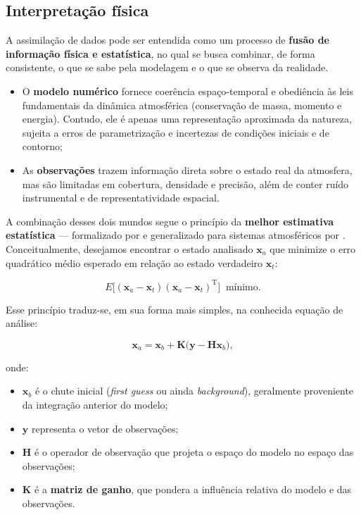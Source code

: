 \subsection*{Interpretação física}

A assimilação de dados pode ser entendida como um processo de \textbf{fusão de informação física e estatística}, no qual se busca combinar, de forma consistente, o que se sabe pela modelagem e o que se observa da realidade.

\begin{itemize}
  \item O \textbf{modelo numérico} fornece coerência espaço-temporal e obediência às leis fundamentais da dinâmica atmosférica (conservação de massa, momento e energia). Contudo, ele é apenas uma representação aproximada da natureza, sujeita a erros de parametrização e incertezas de condições iniciais e de contorno;
  \item As \textbf{observações} trazem informação direta sobre o estado real da atmosfera, mas são limitadas em cobertura, densidade e precisão, além de conter ruído instrumental e de representatividade espacial.
\end{itemize}

A combinação desses dois mundos segue o princípio da \textbf{melhor estimativa estatística} --- formalizado por \citet{Kalman1960} e generalizado para sistemas atmosféricos por \citet{Lorenc1986}.  
Conceitualmente, desejamos encontrar o estado analisado \( \mathbf{x}_a \) que minimize o erro quadrático médio esperado em relação ao estado verdadeiro \( \mathbf{x}_t \):

\begin{equation}
E\big[(\mathbf{x}_a - \mathbf{x}_t)(\mathbf{x}_a - \mathbf{x}_t)^{\mathrm{T}}\big] 
\;\; \text{mínimo.}
\end{equation}


Esse princípio traduz-se, em sua forma mais simples, na conhecida equação de análise:

\begin{equation}
\mathbf{x}_a = \mathbf{x}_b + \mathbf{K}\big(\mathbf{y} - \mathbf{H}\mathbf{x}_b\big),
\end{equation}

onde:
\begin{itemize}
   \item \( \mathbf{x}_b \) é o \gls{chute inicial} (\textit{first guess} ou ainda \textit{background}), geralmente proveniente da integração anterior do modelo;     
  \item \( \mathbf{y} \) representa o vetor de observações;
  \item \( \mathbf{H} \) é o operador de observação que projeta o espaço do modelo no espaço das observações;
  \item \( \mathbf{K} \) é a \textbf{matriz de ganho}, que pondera a influência relativa do modelo e das observações.
\end{itemize}

